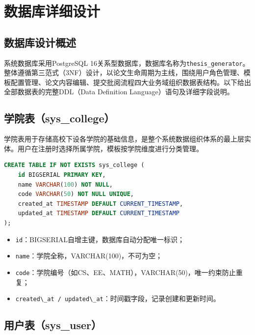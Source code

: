 
\section{数据库详细设计}

\subsection{数据库设计概述}

系统数据库采用PostgreSQL 16关系型数据库，数据库名称为\verb|thesis_generator|。整体遵循第三范式（3NF）设计，以论文生命周期为主线，围绕用户角色管理、模板配置管理、论文内容编辑、提交批阅流程四大业务域组织数据表结构。以下给出全部数据表的完整DDL（Data Definition Language）语句及详细字段说明。

\subsection{学院表（sys\_college）}

学院表用于存储高校下设各学院的基础信息，是整个系统数据组织体系的最上层实体。用户在注册时选择所属学院，模板按学院维度进行分类管理。

\begin{lstlisting}[language=SQL,caption={sys\_college 建表语句}]
CREATE TABLE IF NOT EXISTS sys_college (
    id BIGSERIAL PRIMARY KEY,
    name VARCHAR(100) NOT NULL,
    code VARCHAR(50) NOT NULL UNIQUE,
    created_at TIMESTAMP DEFAULT CURRENT_TIMESTAMP,
    updated_at TIMESTAMP DEFAULT CURRENT_TIMESTAMP
);
\end{lstlisting}

\begin{itemize}
    \item \verb|id|：BIGSERIAL自增主键，数据库自动分配唯一标识；
    \item \verb|name|：学院全称，VARCHAR(100)，不可为空；
    \item \verb|code|：学院编号（如CS、EE、MATH），VARCHAR(50)，唯一约束防止重复；
    \item \verb|created\_at / updated\_at|：时间戳字段，记录创建和更新时间。
\end{itemize}

\subsection{用户表（sys\_user）}

